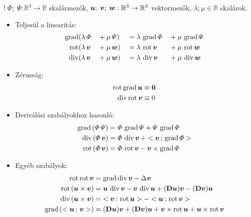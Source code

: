 \documentclass[main.tex]{subfiles}
\begin{document}
$! \; \varPhi; \; \varPsi : \mathbb{R}^3
  \rightarrow \mathbb{R}$ skalármezők,
$\boldsymbol{u}; \; \boldsymbol{v}; \; \boldsymbol{w} : \mathbb{R}^3
  \rightarrow \mathbb{R}^3$ vektormezők,
$\lambda; \mu \in \mathbb{R}$ skalárok.
\begin{itemize}
  \item Teljesül a linearitás:
        \begin{alignat*}{4}
          \operatorname{grad} & (\lambda \, \varPhi  &  & + \mu \, \varPsi)  &  & = \lambda \, \operatorname{grad} \varPhi &  & + \mu \, \operatorname{grad} \varPsi
          \\
          \operatorname{rot}  & (\lambda \, \boldsymbol{v} &  & + \mu \, \boldsymbol{w}) &  & = \lambda \, \operatorname{rot} \boldsymbol{v} &  & + \mu \, \operatorname{rot} \boldsymbol{w}
          \\
          \operatorname{div}  & (\lambda \, \boldsymbol{v} &  & + \mu \, \boldsymbol{w}) &  & = \lambda \, \operatorname{div} \boldsymbol{v} &  & + \mu \, \operatorname{div} \boldsymbol{w}
        \end{alignat*}

  \item Zérusság:
        \begin{alignat*}{1}
          \operatorname{rot} \operatorname{grad} \boldsymbol{u} & \equiv \boldsymbol{0}
          \\
          \operatorname{div} \operatorname{rot} \boldsymbol{v}  & \equiv 0
        \end{alignat*}

  \item Deriválási szabályokhoz hasonló:
        \begin{align*}
          \operatorname{grad} \left( \varPhi \, \varPsi \right)
           & = \varPhi \, \operatorname{grad} \varPsi
          + \varPsi \, \operatorname{grad} \varPhi
          \\
          \operatorname{div} \left( \varPhi \, \boldsymbol{v} \right)
           & = \varPhi \, \operatorname{div} \boldsymbol{v} \,
          + < \boldsymbol{v} \, ; \, \operatorname{grad} \varPhi >
          \\
          \operatorname{rot} \left( \varPhi \, \boldsymbol{v} \right)
           & = \varPhi \, \operatorname{rot} \boldsymbol{v}
          - \boldsymbol{v} \times \operatorname{grad} \varPhi
        \end{align*}

  \item Egyéb szabályok:
        \begin{align*}
          \operatorname{rot} \operatorname{rot} \boldsymbol{v}
           & =\operatorname{grad} \operatorname{div} \boldsymbol{v}
          - \Delta \boldsymbol{v}
          \\
          \operatorname{rot} \left( \boldsymbol{u} \times \boldsymbol{v} \right)
           & = \boldsymbol{u} \, \operatorname{div} \boldsymbol{v}
          - \boldsymbol{v} \, \operatorname{div} \boldsymbol{u}
          + (\mathbf{D} \boldsymbol{u}) \boldsymbol{v}
          - (\mathbf{D} \boldsymbol{v}) \boldsymbol{u}
          \\
          \operatorname{div} \left( \boldsymbol{u} \times \boldsymbol{v} \right)
           & = \; < \boldsymbol{v} \, ; \, \operatorname{rot} \boldsymbol{u} >
          - < \boldsymbol{u} \, ; \, \operatorname{rot} \boldsymbol{v} >
          \\
          \operatorname{grad} \left( < \boldsymbol{u} \, ; \, \boldsymbol{v} > \right)
           & = (\mathbf{D} \boldsymbol{u}) \boldsymbol{v}
          + (\mathbf{D} \boldsymbol{v}) \boldsymbol{u}
          + \boldsymbol{v} \times \operatorname{rot} \boldsymbol{u}
          + \boldsymbol{u} \times \operatorname{rot} \boldsymbol{v}
        \end{align*}
\end{itemize}
\end{document}
